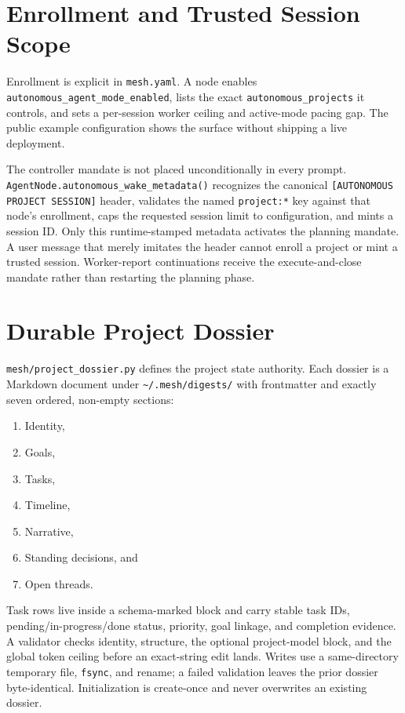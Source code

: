 \documentclass[11pt,letterpaper]{report}
\newcommand{\code}[1]{\texttt{#1}}
\begin{document}
\section{Enrollment and Trusted Session Scope}

Enrollment is explicit in \code{mesh.yaml}. A node enables
\code{autonomous\_agent\_mode\_enabled}, lists the exact
\code{autonomous\_projects} it controls, and sets a per-session worker
ceiling and active-mode pacing gap. The public example configuration shows
the surface without shipping a live deployment.

The controller mandate is not placed unconditionally in every prompt.
\code{AgentNode.autonomous\_wake\_metadata()} recognizes the canonical
\code{[AUTONOMOUS PROJECT SESSION]} header, validates the named
\code{project:*} key against that node's enrollment, caps the requested
session limit to configuration, and mints a session ID. Only this
runtime-stamped metadata activates the planning mandate. A user message that
merely imitates the header cannot enroll a project or mint a trusted session.
Worker-report continuations receive the execute-and-close mandate rather than
restarting the planning phase.

\section{Durable Project Dossier}

\code{mesh/project\_dossier.py} defines the project state authority. Each
dossier is a Markdown document under \code{\textasciitilde/.mesh/digests/}
with frontmatter and exactly seven ordered, non-empty sections:

\begin{enumerate}[nosep]
  \item Identity,
  \item Goals,
  \item Tasks,
  \item Timeline,
  \item Narrative,
  \item Standing decisions, and
  \item Open threads.
\end{enumerate}

Task rows live inside a schema-marked block and carry stable task IDs,
pending/in-progress/done status, priority, goal linkage, and completion
evidence. A validator checks identity, structure, the optional project-model
block, and the global token ceiling before an exact-string edit lands.
Writes use a same-directory temporary file, \code{fsync}, and rename; a
failed validation leaves the prior dossier byte-identical. Initialization is
create-once and never overwrites an existing dossier.
\end{document}

